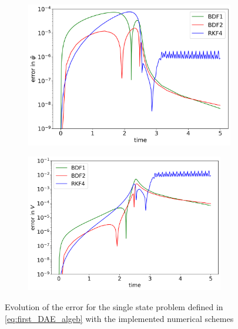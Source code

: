 \begin{figure}[H]
    \centering
    \begin{subfigure}{0.43\textwidth}
    	\centering
    	\includegraphics[width=1\textwidth]{images/timeEvolutionPSIerror.png}
        \label{fig:timeEvolutionErrorPSI}
    \end{subfigure}
    \begin{subfigure}{0.43\textwidth}
    	\centering
    	\includegraphics[width=0.95\textwidth]{images/timeEvolutionVerror.png}
        \label{fig:timeEvolutionVerror}
    \end{subfigure}
    \caption{Evolution of the error for the single state problem defined in \autoref{eq:first_DAE_algeb} with the implemented numerical schemes}
\end{figure}

